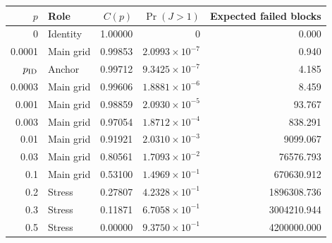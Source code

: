 \begin{tabular}{rlrrr}
\toprule
$p$ & Role & $C(p)$ & $\Pr(J>1)$ & Expected failed blocks \\
\midrule
0 & Identity & 1.00000 & $0$ & 0.000 \\
0.0001 & Main grid & 0.99853 & $2.0993\times10^{-7}$ & 0.940 \\
$p_{\rm ID}$ & Anchor & 0.99712 & $9.3425\times10^{-7}$ & 4.185 \\
0.0003 & Main grid & 0.99606 & $1.8881\times10^{-6}$ & 8.459 \\
0.001 & Main grid & 0.98859 & $2.0930\times10^{-5}$ & 93.767 \\
0.003 & Main grid & 0.97054 & $1.8712\times10^{-4}$ & 838.291 \\
0.01 & Main grid & 0.91921 & $2.0310\times10^{-3}$ & 9099.067 \\
0.03 & Main grid & 0.80561 & $1.7093\times10^{-2}$ & 76576.793 \\
0.1 & Main grid & 0.53100 & $1.4969\times10^{-1}$ & 670630.912 \\
0.2 & Stress & 0.27807 & $4.2328\times10^{-1}$ & 1896308.736 \\
0.3 & Stress & 0.11871 & $6.7058\times10^{-1}$ & 3004210.944 \\
0.5 & Stress & 0.00000 & $9.3750\times10^{-1}$ & 4200000.000 \\
\bottomrule
\end{tabular}
